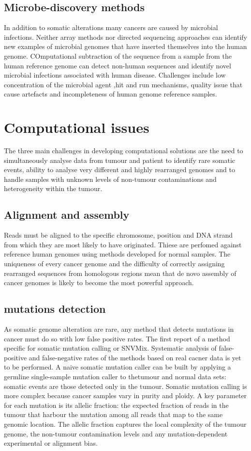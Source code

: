 	\subsection{Microbe-discovery methods}
	In addition to somatic alterations many cancers are caused by microbial infections.
	Neither array methods nor directed sequencing approaches can identify new examples of microbial genomes that have inserted themselves into the human genome.
	COmputational subtraction of the sequence from a sample from the human reference genome can detect non-human sequences and identify novel microbial infections associated with human disease.
	Challenges include low concentration of the microbial agent ,hit and run mechanisms, quality issue that cause artefacts and incompleteness of human genome reference samples.

\section{Computational issues}
The three main challenges in developing computational solutions are the need to simultaneously analyse data from tumour and patient to identify rare somatic events, ability to analyse very different and highly rearranged genomes and to handle samples with unknown levels of non-tumour contaminations and heterogeneity within the tumour.

	\subsection{Alignment and assembly}
	Reads must be aligned to the specific chromosome, position and DNA strand from which they are most likely to have originated.
	Thiese are perfomed against reference human genomes using methods developed for normal samples.
	The uniqueness of every cancer genome and the difficulty of correctly assigning rearranged sequences from homologous regions mean that de novo assembly of cancer genomes is likely to become the most powerful approach.

	\subsection{mutations detection}
	As somatic genome alteration are rare, any method that detects mutations in cancer must do so with low false positive rates.
	The first report of a method specific for somatic mutation calling or SNVMix.
	Systematic analysis of false-positive and false-negative rates of the methods based on real cacner data is yet to be performed.
	A naive somatic mutation caller can be built by applying a germline single-sample mutation caller to thetumour and normal data sets: somatic events are those detected only in the tumour.
	Somatic mutation calling is more complex because cancer samples vary in purity and ploidy.
	A key parameter for each mutation is its allelic fraction: the expected fraction of reads in the tumour that harbour the mutation among all reads that map to the same genomic location.
	The allelic fraction captures the local complexity of the tumour genome, the non-tumour contamination levels and any mutation-dependent experimental or alignment bias.

